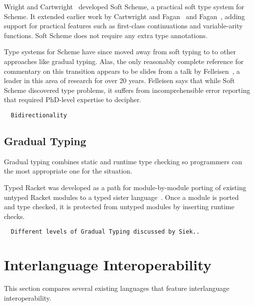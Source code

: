 Wright and Cartwright~\cite{WC97} developed Soft Scheme, a practical
soft type system for Scheme. 
It extended earlier work by Cartwright and Fagan~\cite{CF91}
and Fagan~\cite{Fag91}, adding support for practical features such as
first-class continuations and variable-arity functions.
Soft Scheme does not require any extra type annotations.


Type systems for Scheme have since moved away from soft typing
to to other approaches like gradual typing.
Alas, the only reasonably complete reference for commentary on this transition 
appears to be slides from a talk by Felleisen~\cite{Fell09},
a leader in this area of research for over 20 years.
Felleisen says that while Soft Scheme discovered type problems, 
it suffers from incomprehensible
error reporting that required PhD-level expertise to decipher. 

\begin{verbatim}
  Bidirectionality
\end{verbatim}

\subsection{Gradual Typing}

Gradual typing combines static and runtime type checking so programmers
can the most appropriate one for the situation.

Typed Racket was developed as a path for module-by-module
porting of existing untyped Racket modules to a typed sister language~\cite{Tob10}.
Once a module is ported and type checked, it is protected from untyped modules
by inserting runtime checks.

\begin{verbatim}
  Different levels of Gradual Typing discussed by Siek..
\end{verbatim}

\section{Interlanguage Interoperability}

This section compares several existing languages that feature interlanguage interoperability.

